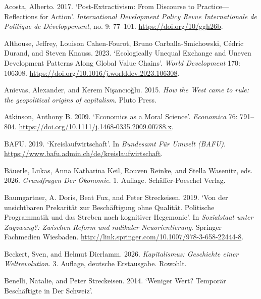 \documentclass[
  british,
  a4paper,
  DIV=11,
  numbers=noendperiod,
  oneside,
  openany]{scrreprt}
\newlength{\cslhangindent}
\newenvironment{CSLReferences}[2] %
 {\begin{list}{}{%
  \setlength{\itemindent}{0pt}
  \setlength{\leftmargin}{0pt}
  \setlength{\parsep}{0pt}
  \ifodd #1
   \setlength{\leftmargin}{\cslhangindent}
   \setlength{\itemindent}{-1\cslhangindent}
  \fi
  \setlength{\itemsep}{#2\baselineskip}}}
 {\end{list}}
\begin{document}
\protect{}\label{refs}
\begin{CSLReferences}{1}{1}
Acosta, Alberto. 2017. {`Post-Extractivism: From Discourse to
Practice---Reflections for Action'}. \emph{International Development
Policy \textbar{} Revue Internationale de Politique de Développement},
no. 9: 77--101. \url{https://doi.org/10/ggh26b}.

Althouse, Jeffrey, Louison Cahen-Fourot, Bruno Carballa-Smichowski,
Cédric Durand, and Steven Knauss. 2023. {`Ecologically Unequal Exchange
and Uneven Development Patterns Along Global Value Chains'}. \emph{World
Development} 170: 106308.
\url{https://doi.org/10.1016/j.worlddev.2023.106308}.

Anievas, Alexander, and Kerem Nişancıoğlu. 2015. \emph{How the West came
to rule: the geopolitical origins of capitalism}. Pluto Press.

Atkinson, Anthony B. 2009. {`Economics as a Moral Science'}.
\emph{Economica} 76: 791--804.
\url{https://doi.org/10.1111/j.1468-0335.2009.00788.x}.

BAFU. 2019. {`Kreislaufwirtschaft'}. In \emph{Bundesamt Für Umwelt
(BAFU)}. \url{https://www.bafu.admin.ch/de/kreislaufwirtschaft}.

Bäuerle, Lukas, Anna Katharina Keil, Rouven Reinke, and Stella Wasenitz,
eds. 2026. \emph{Grundfragen Der {Ökonomie}}. 1. Auflage.
Schäffer-Poeschel Verlag.

Baumgartner, A. Doris, Beat Fux, and Peter Streckeisen. 2019. {`Von der
unsichtbaren Prekarität zur Beschäftigung ohne Qualität. Politische
Programmatik und das Streben nach kognitiver Hegemonie'}. In
\emph{Sozialstaat unter Zugzwang?: Zwischen Reform und radikaler
Neuorientierung}. Springer Fachmedien Wiesbaden.
\url{http://link.springer.com/10.1007/978-3-658-22444-8}.

Beckert, Sven, and Helmut Dierlamm. 2026. \emph{Kapitalismus: Geschichte
einer Weltrevolution}. 3. Auflage, deutsche Erstausgabe. Rowohlt.

Benelli, Natalie, and Peter Streckeisen. 2014. {`Weniger Wert? Temporär
Beschäftigte in Der Schweiz'}.


\end{CSLReferences}
\end{document}
